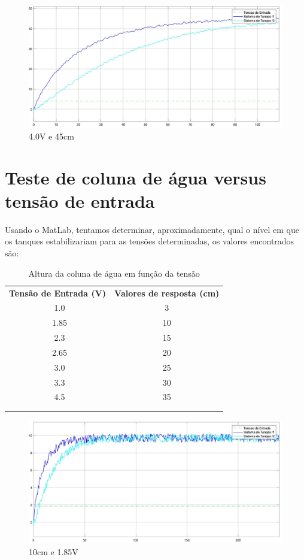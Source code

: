 \documentclass[a4paper,12pt]{article}
\begin{document}
\begin{figure}[H]
	\centering
	\includegraphics[scale=0.20]{./imagens/exp1/V40.jpg}
	\caption{4.0V e 45cm }
\end{figure}

\section{Teste de coluna de água versus tensão de entrada}
Usando o MatLab, tentamos determinar, aproximadamente, qual o nível em que os tanques estabilizariam para as tensões determinadas, os valores encontrados são:

\begin{table}[h]
	\centering
	\begin{tabular}{cc}
		\textbf{Tensão de Entrada (V)} & \textbf{Valores de resposta (cm)} \\
		~1.0 & 3 \\
		~1.85 & 10\\
		~2.3 & 15\\
		~2.65 & 20\\
		~3.0 & 25\\
		~3.3 & 30\\
		~4.5 & 35\\
		\multicolumn{1}{l}{} & \multicolumn{1}{l}{} \\
		\multicolumn{1}{l}{} & \multicolumn{1}{l}{}
	\end{tabular}
	\caption{Altura da coluna de água em função da tensão}
	\label{tab:my-table2}
\end{table}


\begin{figure}[H]
	\centering
	\includegraphics[scale=0.20]{./imagens/exp2/L10.jpg}
	\caption{10cm e 1.85V }
\end{figure}
\end{document}
